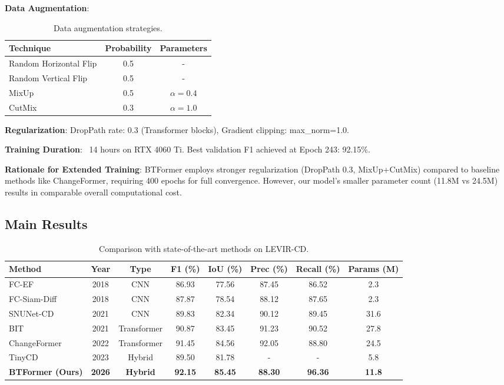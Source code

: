 \documentclass[journal]{IEEEtran}
\begin{document}
\textbf{Data Augmentation}:

\begin{table}[H]
\centering
\caption{Data augmentation strategies.}
\begin{tabular}{lcc}
\toprule
\textbf{Technique} & \textbf{Probability} & \textbf{Parameters} \\
\midrule
Random Horizontal Flip & 0.5 & - \\
Random Vertical Flip & 0.5 & - \\
MixUp & 0.5 & $\alpha=0.4$ \\
CutMix & 0.3 & $\alpha=1.0$ \\
\bottomrule
\end{tabular}
\end{table}

\textbf{Regularization}: DropPath rate: 0.3 (Transformer blocks), Gradient clipping: max\_norm=1.0.

\textbf{Training Duration}: ~14 hours on RTX 4060 Ti. Best validation F1 achieved at Epoch 243: 92.15\%.

\textbf{Rationale for Extended Training}: BTFormer employs stronger regularization (DropPath 0.3, MixUp+CutMix) compared to baseline methods like ChangeFormer, requiring 400 epochs for full convergence. However, our model's smaller parameter count (11.8M vs 24.5M) results in comparable overall computational cost.

\subsection{Main Results}

\begin{table}[H]
\centering
\caption{Comparison with state-of-the-art methods on LEVIR-CD.}
\begin{tabular}{lccccccc}
\toprule
\textbf{Method} & \textbf{Year} & \textbf{Type} & \textbf{F1 (\%)} & \textbf{IoU (\%)} & \textbf{Prec (\%)} & \textbf{Recall (\%)} & \textbf{Params (M)} \\
\midrule
FC-EF & 2018 & CNN & 86.93 & 77.56 & 87.45 & 86.52 & 2.3 \\
FC-Siam-Diff & 2018 & CNN & 87.87 & 78.54 & 88.12 & 87.65 & 2.3 \\
SNUNet-CD & 2021 & CNN & 89.83 & 82.34 & 90.12 & 89.45 & 31.6 \\
BIT & 2021 & Transformer & 90.87 & 83.45 & 91.23 & 90.52 & 27.8 \\
ChangeFormer & 2022 & Transformer & 91.45 & 84.56 & 92.05 & 88.80 & 24.5 \\
TinyCD & 2023 & Hybrid & 89.50 & 81.78 & - & - & 5.8 \\
\midrule
\textbf{BTFormer (Ours)} & \textbf{2026} & \textbf{Hybrid} & \textbf{92.15} & \textbf{85.45} & \textbf{88.30} & \textbf{96.36} & \textbf{11.8} \\
\bottomrule
\end{tabular}
\end{table}
\end{document}
